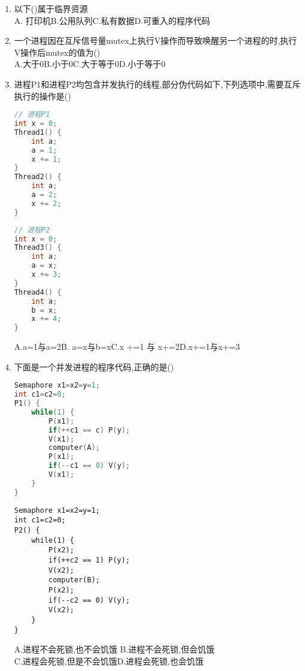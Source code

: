 \documentclass[12pt, a4paper, oneside, UTF8]{ctexbook}
\begin{document}
\begin{enumerate}
    \item 以下()属于临界资源 \\
    A. 打印机\qquad B.公用队列\qquad C.私有数据\qquad D.可重入的程序代码 

    \item 一个进程因在互斥信号量mutex上执行V操作而导致唤醒另一个进程的时,执行V操作后mutex的值为() \\
    A.大于0\qquad B.小于0\qquad C.大于等于0\qquad D.小于等于0 

    \item 进程P1和进程P2均包含并发执行的线程,部分伪代码如下,下列选项中,需要互斥执行的操作是() 
    \begin{center}
        \begin{minipage}[t]{0.45\textwidth}
\begin{lstlisting}[language=C]
// 进程P1                    
int x = 0;                   
Thread1() {                  
    int a;
    a = 1;
    x += 1;
}
Thread2() {
    int a;
    a = 2;
    x += 2;
}
\end{lstlisting}
        \end{minipage}
        \hfill
        \begin{minipage}[t]{0.45\textwidth}
\begin{lstlisting}[language=C]
// 进程P2                    
int x = 0;                   
Thread3() {                  
    int a;
    a = x;
    x += 3;
}
Thread4() {
    int a;
    b = x;
    x += 4;
}
\end{lstlisting}
        \end{minipage}
    \end{center}

    A.a=1与a=2\qquad B. a=x与b=x\qquad C.x +=1 与 x+=2\qquad D.x+=1与x+=3
    \item 下面是一个并发进程的程序代码,正确的是() 
    \begin{center}
        \begin{minipage}[t]{0.45\textwidth}
            \begin{lstlisting}[language=C]
Semaphore x1=x2=y=1;
int c1=c2=0;
P1() {
    while(1) {
        P(x1);
        if(++c1 == c) P(y);
        V(x1);
        computer(A);
        P(x1);
        if(--c1 == 0) V(y);
        V(x1);
    }
}
                \end{lstlisting}
            \end{minipage}
            \hfil
            \begin{minipage}[t]{0.45\textwidth}
                \begin{lstlisting}
Semaphore x1=x2=y=1;
int c1=c2=0;
P2() {
    while(1) {
        P(x2);
        if(++c2 == 1) P(y);
        V(x2);
        computer(B);
        P(x2);
        if(--c2 == 0) V(y);
        V(x2);
    }
}
            \end{lstlisting}
        \end{minipage}
    \end{center}
A.进程不会死锁,也不会饥饿 \qquad B.进程不会死锁,但会饥饿 \\
C.进程会死锁,但是不会饥饿\qquad D.进程会死锁,也会饥饿 


\end{enumerate}
\end{document}
